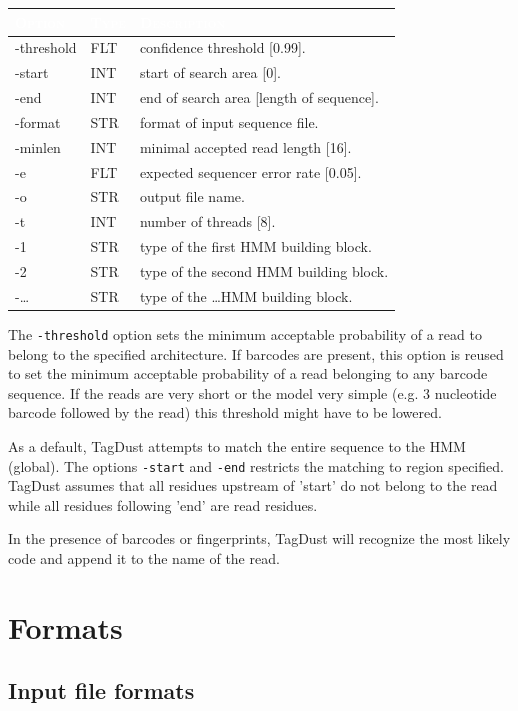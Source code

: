 \documentclass[11pt,a4paper,oneside]{book}
\begin{document}
\begin{center}
\begin{tabular}{| l | l | p{12cm}|}
\hline
\rowcolor{blue} \textcolor{white}{\scshape Option}		&\textcolor{white}{\scshape Type}		&	\textcolor{white}{\scshape Description}\\ \hline
-threshold & FLT & confidence threshold [0.99].\\
-start & INT & start of search area [0].\\
-end & INT & end of  search area [length of sequence].\\
-format & STR & format of input sequence file.\\
-minlen & INT & minimal accepted read length [16].\\
-e & FLT & expected sequencer error rate [0.05].\\ 

-o & STR & output file name.\\
-t & INT & number of threads [8].\\
-1 & STR & type of the first HMM building block. \\
-2 & STR & type of the second HMM building block.\\
-\dots & STR & type of the \dots HMM building block.\\
\hline
\end{tabular}
\end{center}
The {\tt -threshold} option sets the minimum acceptable probability of a read to belong to the specified architecture. If barcodes are present, this option is reused to set the minimum acceptable probability of a read belonging to any barcode sequence. If the reads are very short or the model very simple (e.g. 3 nucleotide barcode followed by the read) this threshold might have to be lowered.


As a default, TagDust attempts to match the entire sequence to the HMM (global). The options {\tt -start} and {\tt -end} restricts the matching to region specified. TagDust assumes that all residues upstream of 'start' do not belong to the read while all residues following 'end' are read residues.

In the presence of barcodes or fingerprints, TagDust will recognize the most likely code and append it to the name of the read. 

\section{Formats}
\subsection{Input file formats}
\end{document}
